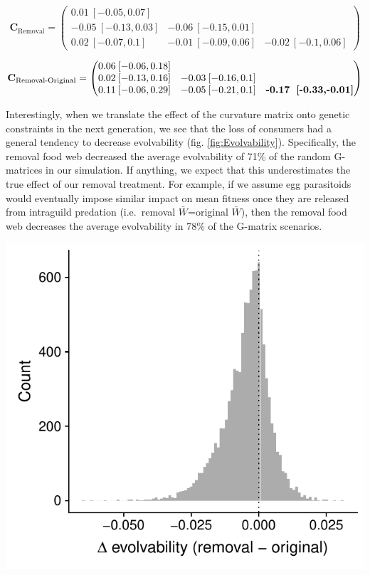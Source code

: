 \documentclass[11pt,]{article}
\let\origfigure\figure
\let\endorigfigure\endfigure
\renewenvironment{figure}[1][2] {
    \expandafter\origfigure\expandafter[H]
} {
    \endorigfigure
}
\begin{document}
\[\textbf{C}_{\text{Removal}} = \begin{pmatrix} 
0.01\: [-0.05,0.07] &  &  \\  
-0.05\: [-0.13,0.03] & -0.06\: [-0.15,0.01] &  \\  
0.02\: [-0.07,0.1] & -0.01\: [-0.09,0.06] & -0.02\: [-0.1,0.06] \end{pmatrix}\]

\[\textbf{C}_{\text{Removal-Original}} = \begin{pmatrix} 
0.06\: [-0.06,0.18] &  &  \\  
0.02\: [-0.13,0.16] & -0.03\: [-0.16,0.1] &  \\  
0.11\: [-0.06,0.29] & -0.05\: [-0.21,0.1] & \textbf{-0.17\: [-0.33,-0.01]} \end{pmatrix}\]

Interestingly, when we translate the effect of the curvature matrix onto
genetic constraints in the next generation, we see that the loss of
consumers had a general tendency to decrease evolvability (fig.
\ref{fig:Evolvability}). Specifically, the removal food web decreased
the average evolvability of 71\% of the random G-matrices in our
simulation. If anything, we expect that this underestimates the true
effect of our removal treatment. For example, if we assume egg
parasitoids would eventually impose similar impact on mean fitness once
they are released from intraguild predation (i.e.~removal
\(\bar W\)=original \(\bar W\)), then the removal food web decreases the
average evolvability in 78\% of the G-matrix scenarios.

\begin{figure}
\centering
\includegraphics{../analyses/delta_evolvability.pdf}
\caption{\label{fig:Evolvability}Change in average evolvability for
10,000 random G-matrices using our best (mean) estimate of the curvature
matrix for each food-web treatment. We found that the curvature of the
removal food web decreased evolvability in 71\% of the G-matrices
(i.e.~the change in evolvability was negative for 71\% of the
simulations), suggesting that the loss of consumers tended to decrease
evolutionary potential of traits in our study.}
\end{figure}
\end{document}
